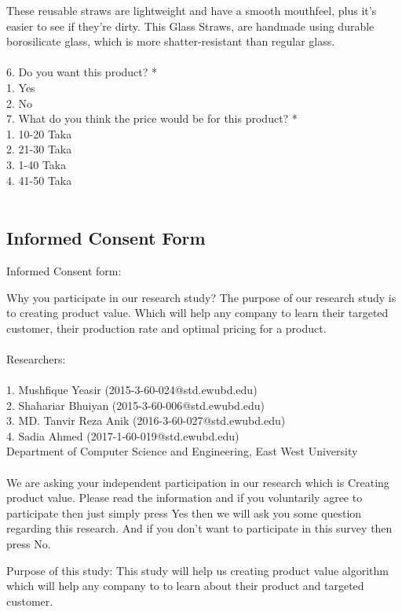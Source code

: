 \documentclass[conference]{IEEEtran}
\begin{document}
These reusable straws are lightweight and have a smooth mouthfeel, plus it's easier to see if they're dirty. This Glass Straws, are handmade using durable borosilicate glass, which is more shatter-resistant than regular glass.
\\\\  
6.	Do you want this product? *\\ 
1.	Yes\\ 
2.	No\\ 
7.	What do you think the price would be for this product? *\\ 
1.	10-20 Taka\\ 
2.	21-30 Taka\\ 
3.	1-40 Taka\\ 
4.	41-50 Taka\\ \\ 
\subsection{Informed Consent Form}
Informed Consent form:
 
Why you participate in our research study?
The purpose of our research study is to creating product value. Which will help any company to learn their targeted customer, their production rate and optimal pricing for a product.\\ \\ 
Researchers:\\ \\ 
1. Mushfique Yeasir (2015-3-60-024@std.ewubd.edu)\\ 
2. Shahariar Bhuiyan (2015-3-60-006@std.ewubd.edu)\\ 
3. MD. Tanvir Reza Anik (2016-3-60-027@std.ewubd.edu)\\ 
4. Sadia Ahmed (2017-1-60-019@std.ewubd.edu)\\
Department of Computer Science and Engineering, East West University\\ \\ 
We are asking your independent participation in our research which is Creating product value. Please read the information and if you voluntarily agree to participate then just simply press Yes then we will ask you some question regarding this research. And if you don’t want to participate in this survey then press No.

Purpose of this study: This study will help us creating product value algorithm which will help any company to to learn about their product and targeted customer.
\end{document}
